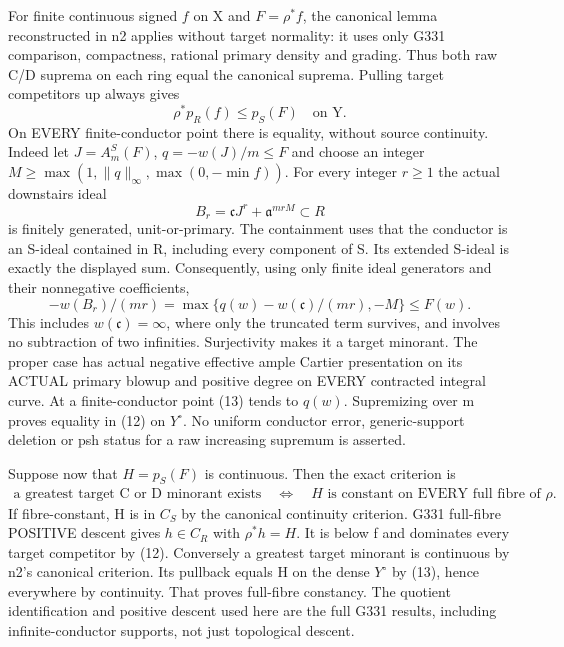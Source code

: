 For finite continuous signed $f$ on X and $F=\rho^*f$, the canonical
lemma reconstructed in n2 applies without target normality: it uses only
G331 comparison, compactness, rational primary density and grading. Thus
both raw C/D suprema on each ring equal the canonical suprema.
Pulling target competitors up always gives
\[
                 \rho^*p_R(f)\le p_S(F)\quad\text{on Y}.    \tag{12}
\]
On EVERY finite-conductor point there is equality, without source
continuity. Indeed let $J=A_m^S(F)$, $q=-w(J)/m\le F$ and choose an
integer $M\ge\max(1,\|q\|_\infty,\max(0,-\min f))$.
For every integer $r\ge1$ the actual downstairs ideal
\[
              B_r=\mathfrak c J^r+\mathfrak a^{mrM}\subset R
\]
is finitely generated, unit-or-primary. The containment uses that the
conductor is an S-ideal contained in R, including every component of S.
Its extended S-ideal is exactly the displayed sum. Consequently, using
only finite ideal generators and their nonnegative coefficients,
\[
 -w(B_r)/(mr)
       =\max\{q(w)-w(\mathfrak c)/(mr),-M\}\le F(w).        \tag{13}
\]
This includes $w(\mathfrak c)=\infty$, where only the truncated term
survives, and involves no subtraction of two infinities. Surjectivity
makes it a target minorant. The proper case has actual negative effective
ample Cartier presentation on its ACTUAL primary blowup and positive
degree on EVERY contracted integral curve. At a finite-conductor point
(13) tends to $q(w)$. Supremizing over m proves equality in (12) on
$Y^\circ$. No uniform conductor error, generic-support deletion or psh
status for a raw increasing supremum is asserted.

Suppose now that $H=p_S(F)$ is continuous. Then the exact criterion is
\[
 \begin{gathered}
 \text{a greatest target C or D minorant exists}\quad\Longleftrightarrow
 \quad H\text{ is constant on EVERY full fibre of }\rho.     \tag{14}
 \end{gathered}
\]
If fibre-constant, H is in $C_S$ by the canonical continuity criterion.
G331 full-fibre POSITIVE descent gives $h\in C_R$ with $\rho^*h=H$.
It is below f and dominates every target competitor by (12).
Conversely a greatest target minorant is continuous by n2's canonical
criterion. Its pullback equals H on the dense $Y^\circ$ by (13), hence
everywhere by continuity. That proves full-fibre constancy. The quotient
identification and positive descent used here are the full G331 results,
including infinite-conductor supports, not just topological descent.

